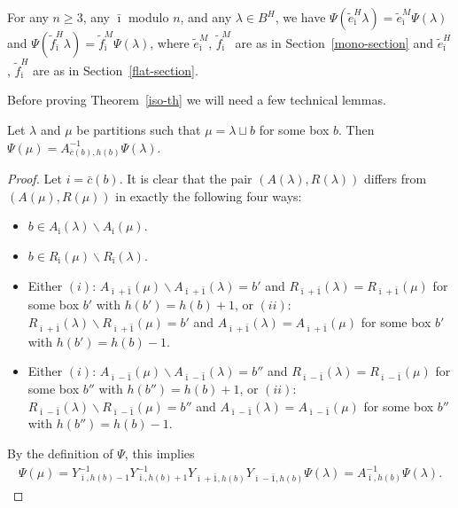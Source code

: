 \begin{Theorem} \label{iso-th}
For any $n \geq 3$, any $\bar \imath$ modulo $n$, and any $\lambda \in B^H$, we have $\Psi(\tilde e_{\bar \imath}^H \lambda) = \tilde e_{\bar \imath}^M \Psi(\lambda)$ and $\Psi(\tilde f_{\bar \imath}^H \lambda) = \tilde f_{\bar \imath}^M \Psi(\lambda)$, where $\tilde e_{\bar \imath}^M$, $\tilde f_{\bar \imath}^M$ are as in Section~{\rm \ref{mono-section}} and $\tilde e_{\bar \imath}^H$, $\tilde f_{\bar \imath}^H$ are as in Section~{\rm \ref{flat-section}}.
\end{Theorem}

Before proving Theorem~\ref{iso-th} we will need a few technical lemmas.

\begin{Lemma} \label{bv}
Let $\lambda$ and $\mu$ be partitions such that $\mu = \lambda \sqcup b$ for some box $b$. Then $\Psi(\mu) = A_{\overline c(b), h(b)}^{-1} \Psi(\lambda).$
\end{Lemma}

\begin{proof} Let $i= \bar c(b)$.
It is clear that the pair $( A(\lambda), R(\lambda))$ dif\/fers from  $( A(\mu), R(\mu))$ in exactly the following four ways:
\begin{itemize}\itemsep=0pt
\item $b \in A_{\bar \imath}(\lambda) \backslash A_{\bar \imath}(\mu)$.

\item   $b \in R_{\bar \imath}(\mu) \backslash R_{\bar \imath}(\lambda)$.


\item Either $(i)$: $A_{\bar \imath + \bar 1}(\mu) \backslash A_{\bar \imath + \bar 1}(\lambda)= b'$ and $ R_{\bar \imath + \bar 1}(\lambda) =R_{\bar \imath + \bar 1}(\mu)$ for some box $b'$ with $h(b') = h(b)+1$, or $(ii)$: $R_{\bar \imath + \bar 1}(\lambda) \backslash R_{\bar \imath + \bar 1}(\mu) = b'$ and $ A_{\bar \imath + \bar 1}(\lambda) =A_{\bar \imath + \bar 1}(\mu)$ for some box $b'$ with $h(b')= h(b)-1$.

\item Either $(i)$: $A_{\bar \imath - \bar 1}(\mu) \backslash A_{\bar \imath - \bar 1}(\lambda)= b''$ and $ R_{\bar \imath - \bar 1}(\lambda) =R_{\bar \imath - \bar 1}(\mu)$ for some box $b''$ with $h(b'') = h(b)+1$, or $(ii)$: $R_{\bar \imath - \bar 1}(\lambda) \backslash R_{\bar \imath - \bar 1}(\mu) = b''$ and $ A_{\bar \imath - \bar 1}(\lambda) =A_{\bar \imath - \bar 1}(\mu)$ for some box $b''$ with $h(b'')= h(b)-1$.
\end{itemize}
By the def\/inition of $\Psi$, this implies
\begin{gather*}
\Psi(\mu)= Y_{\bar \imath, h(b)-1}^{-1}  Y_{\bar \imath, h(b)+1}^{-1}  Y_{\bar \imath+\bar 1, h(b)}^{}  Y_{\bar \imath-\bar 1, h(b)}^{}  \Psi(\lambda) = A_{\bar \imath, h(b)}^{-1} \Psi(\lambda).\tag*{\qed}
\end{gather*}\renewcommand{\qed}{}
\end{proof}

